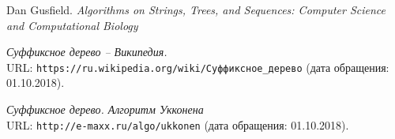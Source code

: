 \begin{thebibliography}{99}
Dan Gusfield.
{\itshape Algorithms on Strings, Trees, and Sequences: Computer Science and Computational Biology}

{\itshape Суффиксное дерево -- Википедия.} \\URL: \texttt{https://ru.wikipedia.org/wiki/Суффиксное\_дерево} (дата обращения: 01.10.2018). 

{\itshape Суффиксное дерево. Алгоритм Укконена} \\URL: \texttt{http://e-maxx.ru/algo/ukkonen} (дата обращения: 01.10.2018). 
\end{thebibliography}
\pagebreak

